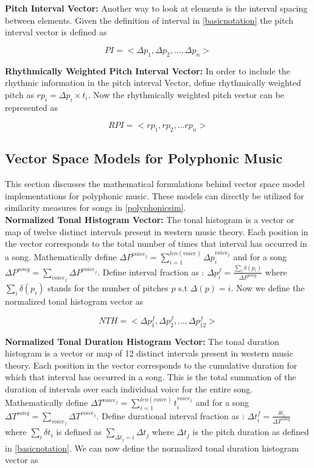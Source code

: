 \noindent \textbf{Pitch Interval Vector:} Another way to look at elements is the interval spacing between elements. Given the definition of interval in \ref{basicnotation} the pitch interval vector is defined as 

\begin{equation}
PI = <\Delta p_1, \Delta p_2, ... , \Delta p_n>
\end{equation}

\noindent \textbf{Rhythmically Weighted Pitch Interval Vector:} In order to include the rhythmic information in the pitch interval Vector, define rhythmically weighted pitch as $rp_i = \Delta p_i \times t_i$. Now the rhythmically weighted pitch vector can be represented as

\begin{equation}
RPI = <rp_1, rp_2, ... rp_n>
\end{equation}

\subsection{Vector Space Models for Polyphonic Music} 

\noindent This section discusses the mathematical formulations behind vector space model implementations for polyphonic music. These models can directly be utilized for similarity measures for songs in \ref{polyphonicsim}. \\

\noindent \textbf{Normalized Tonal Histogram Vector:} The tonal histogram is a vector or map of twelve distinct intervals present in western music theory. Each position in the vector corresponds to the total number of times that interval has occurred in a song. Mathematically define $\Delta P^{voice_j} = \sum_{i=1}^{len(voice)} \Delta p_i^{voice_j}$ and for a song $\Delta P^{song} = \sum_{voice_j} \Delta P^{voice_j}$. Define interval fraction as : $\Delta p^f_i = \frac{\sum_i \delta (p_i)}{\Delta P^{song}}$ where $\sum_i \delta (p_i)$ stands for the number of pitches $p$ s.t $\Delta(p) = i$. Now we define the normalized tonal histogram vector as
 
\begin{equation}
NTH = <\Delta p^f_1, \Delta p^f_2, ... , \Delta p^f_{12}>
\end{equation}

\noindent \textbf{Normalized Tonal Duration Histogram Vector:} The tonal duration histogram is a vector or map of 12 distinct intervals present in western music theory. Each position in the vector corresponds to the cumulative duration for which that interval has occurred in a song. This is the total summation of the duration of intervals over each individual voice for the entire song. Mathematically define $\Delta T^{voice_j} = \sum_{i=1}^{len(voice)} t_i^{voice_j}$ and for a song $\Delta T^{song} = \sum_{voice_j} \Delta T^{voice_j}$. Define durational interval fraction as : $\Delta t^f_i = \frac{\delta t_i}{\Delta T^{song}}$ where $\sum_i \delta t_i$ is defined as $\sum_{\Delta t_j = i} \Delta t_j $ where $\Delta t_j$ is the pitch duration as defined in \ref{basicnotation}. We can now define the normalized tonal duration histogram vector as

